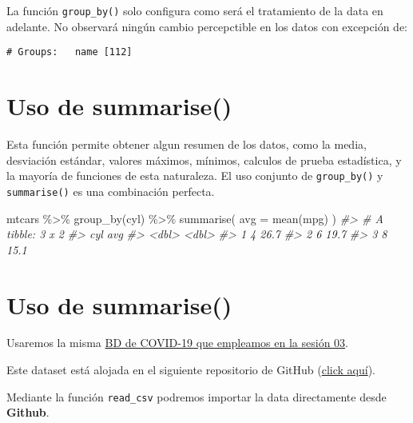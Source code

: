 \documentclass[
]{book}
\newenvironment{Shaded}{\begin{snugshade}}{\end{snugshade}}
\newcommand{\AttributeTok}[1]{\textcolor[rgb]{0.77,0.63,0.00}{#1}}
\newcommand{\CommentTok}[1]{\textcolor[rgb]{0.56,0.35,0.01}{\textit{#1}}}
\newcommand{\FunctionTok}[1]{\textcolor[rgb]{0.00,0.00,0.00}{#1}}
\newcommand{\NormalTok}[1]{#1}
\newcommand{\SpecialCharTok}[1]{\textcolor[rgb]{0.00,0.00,0.00}{#1}}
\begin{document}
La función \texttt{group\_by()} solo configura como será el tratamiento de la data en adelante. No observará ningún cambio percepctible en los datos con excepción de:

\begin{verbatim}
# Groups:   name [112]
\end{verbatim}

\hypertarget{uso-de-summarise}{%
\section{Uso de summarise()}\label{uso-de-summarise}}

Esta función permite obtener algun resumen de los datos, como la media, desviación estándar, valores máximos, mínimos, calculos de prueba estadística, y la mayoría de funciones de esta naturaleza. El uso conjunto de \texttt{group\_by()} y \texttt{summarise()} es una combinación perfecta.

\begin{Shaded}
\begin{Highlighting}[]
\NormalTok{mtcars }\SpecialCharTok{\%\textgreater{}\%}
  \FunctionTok{group\_by}\NormalTok{(cyl) }\SpecialCharTok{\%\textgreater{}\%}
  \FunctionTok{summarise}\NormalTok{(}
    \AttributeTok{avg =} \FunctionTok{mean}\NormalTok{(mpg)}
\NormalTok{  )}
\CommentTok{\#\textgreater{} \# A tibble: 3 x 2}
\CommentTok{\#\textgreater{}     cyl   avg}
\CommentTok{\#\textgreater{}   \textless{}dbl\textgreater{} \textless{}dbl\textgreater{}}
\CommentTok{\#\textgreater{} 1     4  26.7}
\CommentTok{\#\textgreater{} 2     6  19.7}
\CommentTok{\#\textgreater{} 3     8  15.1}
\end{Highlighting}
\end{Shaded}

\hypertarget{uso-de-summarise-1}{%
\section{Uso de summarise()}\label{uso-de-summarise-1}}

Usaremos la misma \href{https://healthinnovation.github.io/curso-introduccion-r-tidyverse/sesion_03/\#19}{BD de COVID-19 que empleamos en la sesión 03}.

Este dataset está alojada en el siguiente repositorio de GitHub (\href{https://github.com/CSSEGISandData/COVID-19}{click aquí}).

Mediante la función \texttt{read\_csv} podremos importar la data directamente desde \textbf{Github}.
\end{document}
